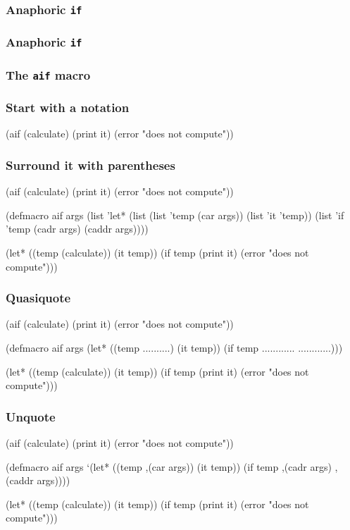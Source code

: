 \documentclass[hyperref={bookmarks=false}]{beamer}
\begin{document}
\begin{frame}[fragile]
\frametitle<1>{Anaphoric \texttt{if}}
\frametitle<2>{Anaphoric \texttt{if}}
\frametitle<3>{The \texttt{aif} macro}
\frametitle<4->{Start with a notation}
\begin{semiverbatim}
(aif (calculate)
  (print it)
  (error "does not compute"))


\end{semiverbatim}
\end{frame}

\begin{frame}[fragile]
\frametitle{Surround it with parentheses}
\begin{semiverbatim}
(aif (calculate)
  (print it)
  (error "does not compute"))

(defmacro aif args
  \alert{(list '}let* \alert{(list (list '}temp  (car args))
  \alert{                  (list '}it \alert{'}temp\alert{))}
    \alert{(list '}if \alert{'}temp
             (cadr args)
             (caddr args)\alert{))})

(let* ((temp (calculate))
       (it temp))
  (if temp
    (print it)
    (error "does not compute")))
\end{semiverbatim}
\end{frame}

\begin{frame}[fragile]
\frametitle{Quasiquote}
\begin{semiverbatim}
(aif (calculate)
  (print it)
  (error "does not compute"))

(defmacro aif args
  (let*            ((temp  ..........)
                          (it  temp))
          (if  temp
             ............
             ............)))

(let* ((temp (calculate))
       (it temp))
  (if temp
    (print it)
    (error "does not compute")))
\end{semiverbatim}
\end{frame}

\begin{frame}[fragile]
\frametitle{Unquote}
\begin{semiverbatim}
(aif (calculate)
  (print it)
  (error "does not compute"))

(defmacro aif args
  \alert{     `}(let*            ((temp \alert{,(car args)})
                          (it  temp))
          (if  temp
            \alert{,(cadr args)}
            \alert{,(caddr args)})))

(let* ((temp (calculate))
       (it temp))
  (if temp
    (print it)
    (error "does not compute")))
\end{semiverbatim}
\end{frame}
\end{document}
